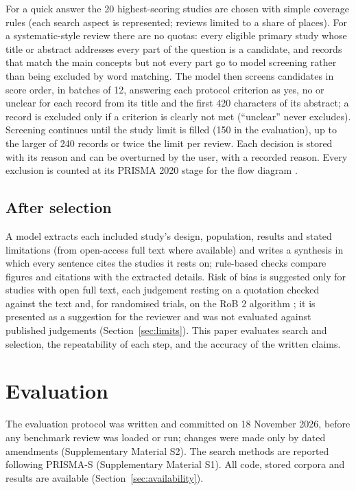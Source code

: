 For a quick answer the 20 highest-scoring studies are chosen with simple coverage rules (each search aspect is
represented; reviews limited to a share of places). For a systematic-style review there are no quotas: every
eligible primary study whose title or abstract addresses every part of the question is a candidate, and records
that match the main concepts but not every part go to model screening rather than being excluded by word matching.
The model then screens candidates in score order, in batches of 12, answering each protocol criterion as yes, no
or unclear for each record from its title and the first 420 characters of its abstract; a record is excluded only
if a criterion is clearly not met (``unclear'' never excludes). Screening continues until the study limit is filled
(150 in the evaluation), up to the larger of 240 records or twice the limit per review. Each decision is stored
with its reason and can be overturned by the user, with a recorded reason. Every exclusion is counted at its PRISMA
2020 stage for the flow diagram \citep{page2021prisma}.

\subsection{After selection}

A model extracts each included study's design, population, results and stated limitations (from open-access full
text where available) and writes a synthesis in which every sentence cites the studies it rests on; rule-based
checks compare figures and citations with the extracted details. Risk of bias is suggested only for studies with
open full text, each judgement resting on a quotation checked against the text and, for randomised trials, on the
RoB 2 algorithm \citep{sterne2019rob2}; it is presented as a suggestion for the reviewer and was not evaluated
against published judgements (Section~\ref{sec:limits}). This paper evaluates search and selection, the
repeatability of each step, and the accuracy of the written claims.

\section{Evaluation}
\label{sec:eval}

The evaluation protocol was written and committed on 18 November 2026, before any benchmark review was loaded or
run; changes were made only by dated amendments (Supplementary Material S2). The search methods are reported
following PRISMA-S \citep{rethlefsen2021prismas} (Supplementary Material S1). All code, stored corpora and results
are available (Section~\ref{sec:availability}).


